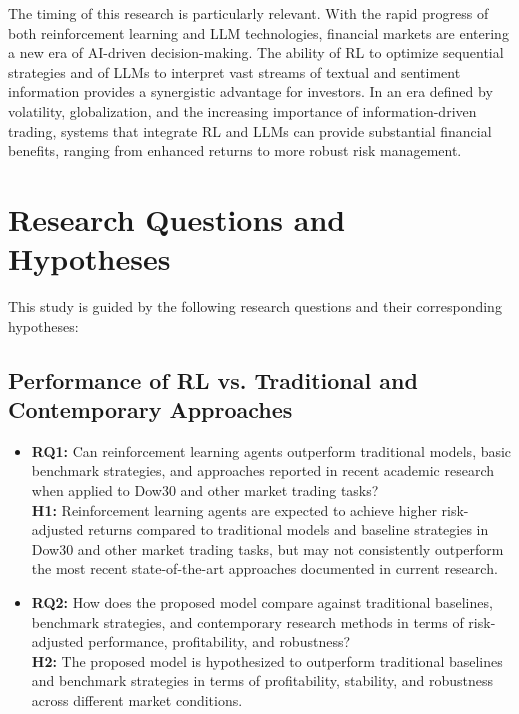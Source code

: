\documentclass[12pt,a4paper]{report}
\begin{document}
The timing of this research is particularly relevant. With the rapid progress of both reinforcement learning and LLM technologies, financial markets are entering a new era of AI-driven decision-making. The ability of RL to optimize sequential strategies and of LLMs to interpret vast streams of textual and sentiment information provides a synergistic advantage for investors. In an era defined by volatility, globalization, and the increasing importance of information-driven trading, systems that integrate RL and LLMs can provide substantial financial benefits, ranging from enhanced returns to more robust risk management.



\section{Research Questions and Hypotheses}

This study is guided by the following research questions and their corresponding hypotheses:

\subsection*{Performance of RL vs. Traditional and Contemporary Approaches}
\begin{itemize}
    \item \textbf{RQ1:} Can reinforcement learning agents outperform traditional models, basic benchmark strategies, and approaches reported in recent academic research when applied to Dow30 and other market trading tasks? \\
    \textbf{H1:} Reinforcement learning agents are expected to achieve higher risk-adjusted returns compared to traditional models and baseline strategies in Dow30 and other market trading tasks, but may not consistently outperform the most recent state-of-the-art approaches documented in current research.

    \item \textbf{RQ2:} How does the proposed model compare against traditional baselines, benchmark strategies, and contemporary research methods in terms of risk-adjusted performance, profitability, and robustness? \\
    \textbf{H2:} The proposed model is hypothesized to outperform traditional baselines and benchmark strategies in terms of profitability, stability, and robustness across different market conditions.
\end{itemize}
\end{document}
